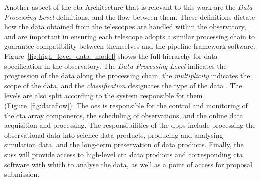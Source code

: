 Another aspect of the \gls{cta} Architecture that is relevant to this work are the \textit{Data Processing Level} definitions, and the flow between them. These definitions dictate how the data obtained from the telescopes are handled within the observatory, and are important in ensuring each telescope adopts a similar processing chain to guarantee compatibility between themselves and the pipeline framework software. Figure~\ref{fig:high_level_data_model} shows the full hierarchy for data specification in the observatory. The \textit{Data Processing Level} indicates the progression of the data along the processing chain, the \textit{multiplicity} indicates the scope of the data, and the \textit{classification} designates the type of the data \cite{Kosack2017}. The levels are also split according to the system responsible for them (Figure~\ref{fig:dataflow}). The \gls{oes} is responsible for the control and monitoring of the \gls{cta} array components, the scheduling of observations, and the online data acquisition and processing. The responsibilities of the \gls{dpps} include processing the observational data into science data products, producing and analysing simulation data, and the long-term preservation of data products. Finally, the \gls{suss} will provide access to high-level \gls{cta} data products and corresponding \gls{cta} software with which to analyse the data, as well as a point of access for proposal submission.

